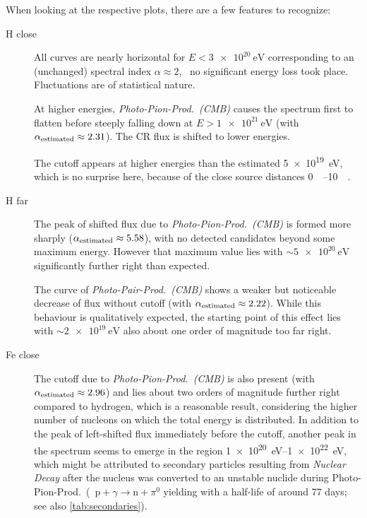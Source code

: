 When looking at the respective plots, there are a few features to recognize:
\begin{description}
    \item[H close]
        All curves are nearly horizontal for $E<\SI{3e20}{\electronvolt}$
        corresponding to an (unchanged) spectral index $\alpha\approx2$,
        \ie~no significant energy loss took place. Fluctuations are of
        statistical nature.

        At higher energies, \emph{Photo-Pion-Prod.~(CMB)} causes the
        spectrum first to flatten before steeply falling down at
        $E>\SI{1e21}{\electronvolt}$ (with $\alpha_{\mathrm{estimated}}\approx2.31$). The CR
        flux is shifted to lower energies.

        The cutoff appears at higher energies than the estimated
        \SI{5e19}{\electronvolt}, which is no surprise here, because of the
        close source distances \SIrange{0}{10}{\mega\parsec}.

    \item[H far]
        The peak of shifted flux due to \emph{Photo-Pion-Prod.~(CMB)} is formed
        more sharply ($\alpha_{\mathrm{estimated}}\approx5.58$), with no
        detected candidates beyond some maximum energy. However that maximum
        value lies with $\sim\SI{5e20}{\electronvolt}$ significantly further
        right than expected.

        The curve of \emph{Photo-Pair-Prod.~(CMB)} shows a weaker but
        noticeable decrease of flux without cutoff (with
        $\alpha_{\mathrm{estimated}}\approx2.22$). While this behaviour is
        qualitatively expected, the starting point of this effect lies with
        $\sim\SI{2e19}{\electronvolt}$ also about one order of magnitude too
        far right.

    \item[Fe close]
        The cutoff due to \emph{Photo-Pion-Prod.~(CMB)} is also present (with
        $\alpha_{\mathrm{estimated}}\approx2.96$) and
        lies about two orders of magnitude further right compared to hydrogen,
        which is a reasonable result, considering the higher number of
        nucleons on which the total energy is distributed. In addition to
        the peak of left-shifted flux immediately before the cutoff,
        another peak in the spectrum seems to emerge in the region
        \SIrange{1e20}{1e22}{\electronvolt}, which might be attributed to
        secondary particles resulting from \emph{Nuclear Decay} after the
        nucleus was converted to an unstable nuclide during
        Photo-Pion-Prod.~(\eg~${\text{p}+\gamma\to\text{n}+\pi^0}$ yielding
         with a half-life of around 77 days; see also
        \cref{tab:secondaries}).


\end{description}
